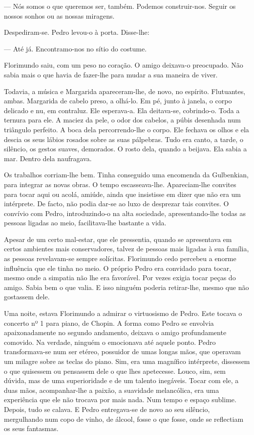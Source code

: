 --- Nós somos o que queremos ser, também. Podemos construir-nos. Seguir os
nossos sonhos ou as nossas miragens.

Despediram-se. Pedro levou-o à porta. Disse-lhe:

--- Até já. Encontramo-nos no sítio do costume.

Florimundo saiu, com um peso no coração. O amigo deixava-o preocupado.
Não sabia mais o que havia de fazer-lhe para mudar a sua maneira de
viver.

Todavia, a música e Margarida apareceram-lhe, de novo, no espírito.
Flutuantes, ambas. Margarida de cabelo preso, a olhá-lo. Em pé, junto à
janela, o corpo delicado e nu, em contraluz. Ele esperava-a. Ela
deitava-se, cobrindo-o. Toda a ternura para ele. A maciez da pele, o
odor dos cabelos, a púbis desenhada num triângulo perfeito. A boca dela
percorrendo-lhe o corpo. Ele fechava os olhos e ela descia os seus
lábios rosados sobre as suas pálpebras. Tudo era canto, a tarde, o
silêncio, os gestos suaves, demorados. O rosto dela, quando a beijava.
Ela sabia a mar. Dentro dela naufragava.

Os trabalhos corriam-lhe bem. Tinha conseguido uma encomenda da
Gulbenkian, para integrar as novas obras. O tempo escasseava-lhe.
Apareciam-lhe convites para tocar aqui ou acolá, amiúde, ainda que
insistisse em dizer que não era um intérprete. De facto, não podia
dar-se ao luxo de desprezar tais convites. O convívio com Pedro,
introduzindo-o na alta sociedade, apresentando-lhe todas as pessoas
ligadas ao meio, facilitava-lhe bastante a vida.

Apesar de um certo mal-estar, que ele pressentia, quando se apresentava
em certos ambientes mais conservadores, talvez de pessoas mais ligadas à
sua família, as pessoas revelavam-se sempre solícitas. Florimundo cedo
percebeu a enorme influência que ele tinha no meio. O próprio Pedro era
convidado para tocar, mesmo onde a simpatia não lhe era favorável. Por
vezes exigia tocar peças do amigo. Sabia bem o que valia. E isso ninguém
poderia retirar-lhe, mesmo que não gostassem dele.

Uma noite, estava Florimundo a admirar o virtuosismo de Pedro. Este
tocava o concerto nº 1 para piano, de Chopin. A forma como Pedro se
envolvia apaixonadamente no segundo andamento, deixava o amigo
profundamente comovido. Na verdade, ninguém o emocionava até aquele
ponto. Pedro transformava-se num ser etéreo, possuidor de umas longas
mãos, que operavam um milagre sobre as teclas do piano. Sim, era uma
magnífico intérprete, dissessem o que quisessem ou pensassem dele o que
lhes apetecesse. Louco, sim, sem dúvida, mas de uma superioridade e de
um talento inegáveis. Tocar com ele, a duas mãos, acompanhar-lhe a
paixão, a suavidade melancólica, era uma experiência que ele não trocava
por mais nada. Num tempo e espaço sublime. Depois, tudo se calava. E
Pedro entregava-se de novo ao seu silêncio, mergulhando num copo de
vinho, de álcool, fosse o que fosse, onde se reflectiam os seus
fantasmas.

